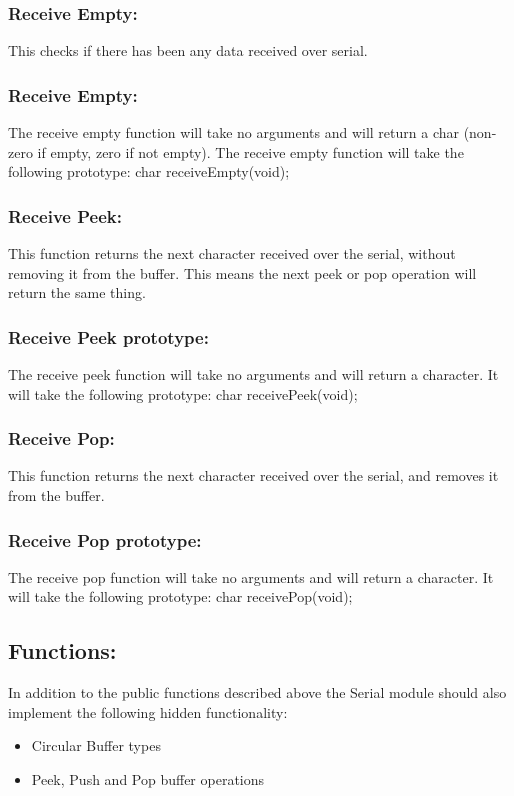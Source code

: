 \documentclass[]{article}
\begin{document}
\subsubsection{Receive Empty:}
This checks if there has been any data received over serial.

\subsubsection{Receive Empty:}
The receive empty function will take no arguments and will return a char (non-zero if empty, zero if not empty). The receive empty function will take the following prototype: \newline \newline
char receiveEmpty(void);

\subsubsection{Receive Peek:}
This function returns the next character received over the serial, without removing it from the buffer. This means the next peek or pop operation will return the same thing.

\subsubsection{Receive Peek prototype:}
The receive peek function will take no arguments and will return a character. It will take the following prototype: \newline \newline
char receivePeek(void);

\subsubsection{Receive Pop:}
This function returns the next character received over the serial, and removes it from the buffer.

\subsubsection{Receive Pop prototype:}
The receive pop function will take no arguments and will return a character. It will take the following prototype: \newline \newline
char receivePop(void);

\subsection{Functions:}
In addition to the public functions described above the Serial module should also implement the following hidden functionality:
\begin{itemize}
	\item Circular Buffer types
	\item Peek, Push and Pop buffer operations
\end{itemize}
\end{document}
